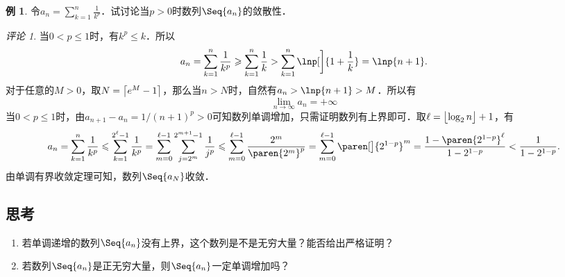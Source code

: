 \documentclass[a4paper,punct=CCT]{ctexbook}
\makeatletter
\theoremstyle{definition}
\newtheorem*{example*}{例}
\theoremstyle{remark}
\newtheorem*{remark}{评论}
\newif\ifshowsolp
\renewenvironment{proof}[1][\proofname]{\par
  \pushQED{\qed}%
  \normalfont \topsep6\p@\@plus6\p@\relax
  \trivlist
  \item[]\ignorespaces
}{%
  \popQED\endtrivlist\@endpefalse
}
\let\leq\leqslant
\let\le\leq
\let\geq\geqslant
\let\ge\geq}
\makeatother
\begin{document}
\begin{example*}
  令\(\displaystyle a_n = \sum_{k=1}^n \frac1{k^p}\)．试讨论当\(p > 0\)时数列\(\Seq{a_n}\)的敛散性．

  \begin{remark}
    当\(0 < p \le 1\)时，有\(k^p \le k\)．所以
    \begin{equation*}
      a_n = \sum_{k=1}^n \frac1{k^p} \ge \sum_{k=1}^n \frac1{k}
      > \sum_{k=1}^n \lnp[\bigg]{1+\frac1k} = \lnp{n+1}.
    \end{equation*}
    对于任意的\(M > 0\)，取\(N = \ceil[\big]{e^M - 1}\)，那么当\(n > N\)时，自然有\(a_n > \lnp{n+1} > M\)．所以有
    \begin{equation*}
      \lim_{n\to\infty} a_n = +\infty
    \end{equation*}
    当\(0 < p \le 1\)时，由\(a_{n+1} - a_n = 1/(n+1)^p > 0\)可知数列单调增加，只需证明数列有上界即可．取\(\ell = \floor[\big]{\log_2 n} + 1\)，有
    \begin{equation*}
      a_n
      = \sum_{k=1}^n \frac1{k^p}
      \le \sum_{k=1}^{2^\ell-1} \frac1{k^p}
      = \sum_{m=0}^{\ell-1} \sum_{j=2^m}^{2^{m+1}-1} \frac{1}{j^p}
      \le \sum_{m=0}^{\ell-1} \frac{2^m}{\paren{2^m}^p}
      = \sum_{m=0}^{\ell-1} \paren[\big]{2^{1-p}}^m
      = \frac{1-\paren{2^{1-p}}^\ell}{1-2^{1-p}}
      < \frac{1}{1-2^{1-p}}.
    \end{equation*}
    由单调有界收敛定理可知，数列\(\Seq{a_N}\)收敛．
  \end{remark}
\end{example*}

\subsection*{思考}

\begin{enumerate}
\item 若单调递增的数列\(\Seq{a_n}\)没有上界，这个数列是不是无穷大量？能否给出严格证明？

  \ifshowsolp
  是无穷大量，证明如下．

  \begin{proof}
    因为数列\(\Seq{a_n}\)没有上界，所以对任意的\(M > 0\)都存在一个正整数\(N\)使得\(a_N > M\)．这时，对于所有的\(n > N\)，因为数列\(\Seq{a_n}\)单调递增，所以
    \begin{equation*}
      a_n \ge a_N > M. \qedhere
    \end{equation*}
  \end{proof}
  \fi

\item 若数列\(\Seq{a_n}\)是正无穷大量，则\(\Seq{a_n}\)一定单调增加吗？

  \ifshowsolp
  未必．\(a_n = n + (-1)^n\)，易证\(\lim\limits_{n\to\infty} a_n = +\infty\)．此时，对于任意的正偶数\(k\)都有
  \begin{equation*}
    a_{k+1} = (k+1) + (-1)^{k+1} = k < k + 1 = k + (-1)^k = a_k.
  \end{equation*}
  \fi
\end{enumerate}
\end{document}
